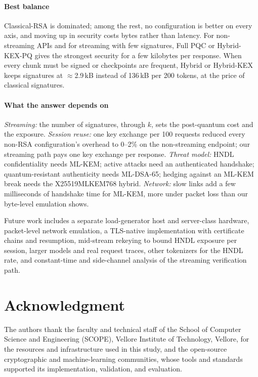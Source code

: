 \documentclass[conference]{IEEEtran}
\begin{document}
\paragraph*{Best balance} Classical-RSA is dominated; among the rest, no configuration is better on every
axis, and moving up in security costs bytes rather than latency. For non-streaming APIs and for streaming
with few signatures, Full PQC or Hybrid-KEX-PQ gives the strongest security for a few kilobytes per
response. When every chunk must be signed or checkpoints are frequent, Hybrid or Hybrid-KEX keeps
signatures at $\approx$2.9\,kB instead of 136\,kB per 200 tokens, at the price of classical signatures.

\paragraph*{What the answer depends on} \emph{Streaming:} the number of signatures, through $k$, sets the
post-quantum cost and the exposure. \emph{Session reuse:} one key exchange per 100 requests reduced every
non-RSA configuration's overhead to 0--2\% on the non-streaming endpoint; our streaming path pays one key
exchange per response. \emph{Threat model:} HNDL confidentiality needs ML-KEM; active
attacks need an authenticated handshake; quantum-resistant authenticity needs ML-DSA-65; hedging against an
ML-KEM break needs the X25519MLKEM768 hybrid. \emph{Network:} slow links add a few milliseconds of
handshake time for ML-KEM, more under packet loss than our byte-level emulation shows.

Future work includes a separate load-generator host and server-class hardware, packet-level network
emulation, a TLS-native implementation with certificate chains and resumption, mid-stream rekeying to
bound HNDL exposure per session, larger models and real request traces, other tokenizers for the HNDL
rate, and constant-time and side-channel analysis of the streaming verification path.

\section*{Acknowledgment}
The authors thank the faculty and technical staff of the School of Computer Science and Engineering
(SCOPE), Vellore Institute of Technology, Vellore, for the resources and infrastructure used in this
study, and the open-source cryptographic and machine-learning communities, whose tools and standards
supported its implementation, validation, and evaluation.
\end{document}
